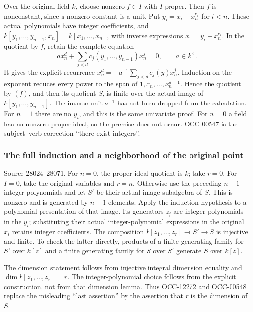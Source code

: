 Over the original field \(k\), choose nonzero \(f\in I\) with \(I\) proper. Then \(f\) is nonconstant, since a nonzero constant is a unit. Put \(y_i=x_i-x_n^{e_i}\) for \(i<n\). These actual polynomials have integer coefficients, and \(k[y_1,\ldots,y_{n-1},x_n]=k[x_1,\ldots,x_n]\), with inverse expressions \(x_i=y_i+x_n^{e_i}\). In the quotient by \(f\), retain the complete equation \[
 a x_n^d+\sum_{j<d}c_j(y_1,\ldots,y_{n-1})x_n^j=0,\qquad a\in k^\times.
\] It gives the explicit recurrence \(x_n^d=-a^{-1}\sum_{j<d}c_j(y)x_n^j\). Induction on the exponent reduces every power to the span of \(1,x_n,\ldots,x_n^{d-1}\). Hence the quotient by \((f)\), and then its quotient \(S\), is finite over the actual image of \(k[y_1,\ldots,y_{n-1}]\). The inverse unit \(a^{-1}\) has not been dropped from the calculation. For \(n=1\) there are no \(y_i\), and this is the same univariate proof. For \(n=0\) a field has no nonzero proper ideal, so the premise does not occur. OCC-00547 is the subject--verb correction ``there exist integers''.

\subsubsection{The full induction and a neighborhood of the original point}\label{algebra-proof-026-the-full-induction-and-a-neighborhood-of-the-original-point}

Source 28024--28071. For \(n=0\), the proper-ideal quotient is \(k\); take \(r=0\). For \(I=0\), take the original variables and \(r=n\). Otherwise use the preceding \(n-1\) integer polynomials and let \(S'\) be their actual image subalgebra of \(S\). This is nonzero and is generated by \(n-1\) elements. Apply the induction hypothesis to a polynomial presentation of that image. Its generators \(z_j\) are integer polynomials in the \(y_i\); substituting their actual integer-polynomial expressions in the original \(x_i\) retains integer coefficients. The composition \(k[z_1,\ldots,z_r]\to S'\to S\) is injective and finite. To check the latter directly, products of a finite generating family for \(S'\) over \(k[z]\) and a finite generating family for \(S\) over \(S'\) generate \(S\) over \(k[z]\).

The dimension statement follows from injective integral dimension equality and \(\dim k[z_1,\ldots,z_r]=r\). The integer-polynomial choice follows from the explicit construction, not from that dimension lemma. Thus OCC-12272 and OCC-00548 replace the misleading ``last assertion'' by the assertion that \(r\) is the dimension of \(S\).

